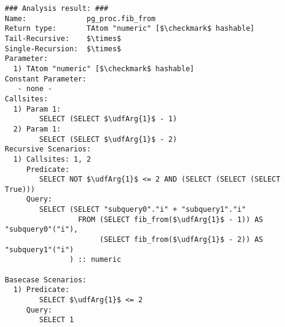 \begin{lstlisting}[basicstyle=\ttfamily\scriptsize]
### Analysis result: ###
Name:              pg_proc.fib_from
Return type:       TAtom "numeric" [$\checkmark$ hashable]
Tail-Recursive:    $\times$
Single-Recursion:  $\times$
Parameter:
  1) TAtom "numeric" [$\checkmark$ hashable]
Constant Parameter:
   - none -
Callsites:
  1) Param 1:
        SELECT (SELECT $\udfArg{1}$ - 1) 
  2) Param 1:
        SELECT (SELECT $\udfArg{1}$ - 2) 
Recursive Scenarios:
  1) Callsites: 1, 2
     Predicate:
        SELECT NOT $\udfArg{1}$ <= 2 AND (SELECT (SELECT (SELECT True)))
     Query:
        SELECT (SELECT "subquery0"."i" + "subquery1"."i" 
                 FROM (SELECT fib_from($\udfArg{1}$ - 1)) AS "subquery0"("i"), 
                      (SELECT fib_from($\udfArg{1}$ - 2)) AS "subquery1"("i")
               ) :: numeric

Basecase Scenarios:
  1) Predicate:
        SELECT $\udfArg{1}$ <= 2
     Query:
        SELECT 1
\end{lstlisting}